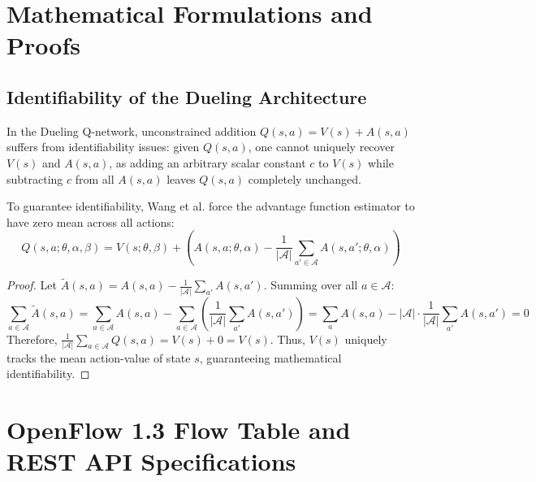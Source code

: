 \documentclass[12pt,a4paper,oneside]{report}
\begin{document}
\clearpage

\appendix

\chapter{Mathematical Formulations and Proofs}
\label{app:math_proofs}

\section{Identifiability of the Dueling Architecture}
In the Dueling Q-network, unconstrained addition $Q(s, a) = V(s) + A(s, a)$ suffers from identifiability issues: given $Q(s, a)$, one cannot uniquely recover $V(s)$ and $A(s, a)$, as adding an arbitrary scalar constant $c$ to $V(s)$ while subtracting $c$ from all $A(s, a)$ leaves $Q(s, a)$ completely unchanged.

To guarantee identifiability, Wang et al. \cite{wang2016dueling} force the advantage function estimator to have zero mean across all actions:
\begin{equation}
Q(s, a; \theta, \alpha, \beta) = V(s; \theta, \beta) + \left( A(s, a; \theta, \alpha) - \frac{1}{|\mathcal{A}|} \sum_{a' \in \mathcal{A}} A(s, a'; \theta, \alpha) \right)
\end{equation}
\begin{proof}
Let $\tilde{A}(s, a) = A(s, a) - \frac{1}{|\mathcal{A}|} \sum_{a'} A(s, a')$. Summing over all $a \in \mathcal{A}$:
\begin{equation}
\sum_{a \in \mathcal{A}} \tilde{A}(s, a) = \sum_{a \in \mathcal{A}} A(s, a) - \sum_{a \in \mathcal{A}} \left( \frac{1}{|\mathcal{A}|} \sum_{a'} A(s, a') \right) = \sum_{a} A(s, a) - |\mathcal{A}| \cdot \frac{1}{|\mathcal{A}|} \sum_{a'} A(s, a') = 0
\end{equation}
Therefore, $\frac{1}{|\mathcal{A}|} \sum_{a \in \mathcal{A}} Q(s, a) = V(s) + 0 = V(s)$. Thus, $V(s)$ uniquely tracks the mean action-value of state $s$, guaranteeing mathematical identifiability.
\end{proof}

\chapter{OpenFlow 1.3 Flow Table and REST API Specifications}
\label{app:openflow_api}
\end{document}
